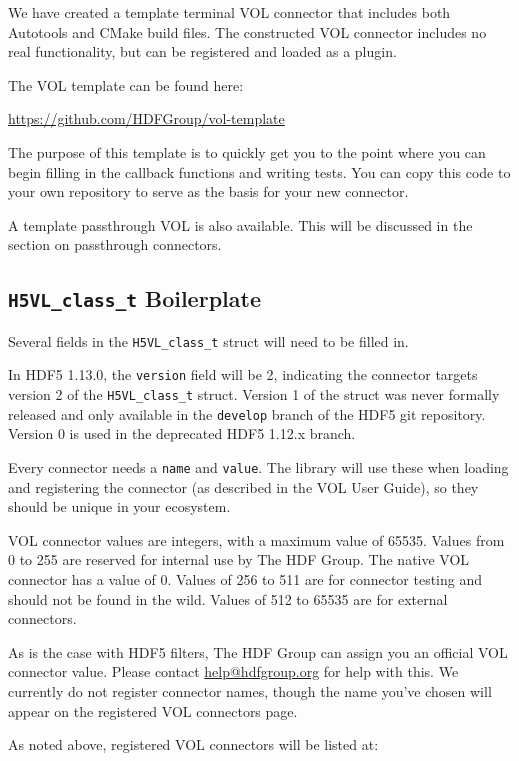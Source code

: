 We have created a template terminal VOL connector that includes both Autotools and CMake
build files. The constructed VOL connector includes no real functionality, but 
can be registered and loaded as a plugin.

The VOL template  can be found here:

\quad \quad \url{https://github.com/HDFGroup/vol-template}

The purpose of this template is to quickly get you to the point where you can
begin filling in the callback functions and writing tests. You can copy this
code to your own repository to serve as the basis for your new connector.

A template passthrough VOL is also available. This will be discussed in the
section on passthrough connectors.

\subsection{{\tt H5VL\_class\_t} Boilerplate}

Several fields in the {\tt H5VL\_class\_t} struct will need to be filled in.

In HDF5 1.13.0, the {\tt version} field will be 2, indicating the connector
targets version 2 of the {\tt H5VL\_class\_t} struct. Version 1 of the struct
was never formally released and only available in the {\tt develop} branch of
the HDF5 git repository. Version 0 is used in the deprecated HDF5 1.12.x branch.

Every connector needs a {\tt name} and {\tt value}. The library will use these when
loading and registering the connector (as described in the VOL User Guide), so
they should be unique in your ecosystem.

VOL connector values are integers, with a maximum value of 65535. Values from
0 to 255 are reserved for internal use by The HDF Group. The native VOL connector
has a value of 0. Values of 256 to 511 are for connector testing and should
not be found in the wild. Values of 512 to 65535 are for external connectors.

As is the case with HDF5 filters, The HDF Group can assign you an official
VOL connector value. Please contact
\href{mailto:help@hdfgroup.org}{help@hdfgroup.org} for help with this. We currently
do not register connector names, though the name you've chosen will appear on
the registered VOL connectors page.

As noted above, registered VOL connectors will be listed at:

